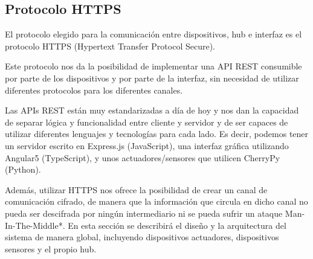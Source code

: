 \subsection{Protocolo HTTPS}
El protocolo elegido para la comunicación entre dispositivos, hub e interfaz es el protocolo HTTPS (Hypertext Transfer Protocol Secure).
\par
Este protocolo nos da la posibilidad de implementar una API REST consumible por parte de los dispositivos y por parte de la interfaz,
sin necesidad de utilizar diferentes protocolos para los diferentes canales.
\par
Las APIs REST están muy estandarizadas a día de hoy y nos dan la capacidad de separar lógica y funcionalidad entre cliente y servidor y de ser capaces
de utilizar diferentes lenguajes y tecnologías para cada lado. Es decir, podemos tener un servidor escrito en Express.js (JavaScript), una interfaz 
gráfica utilizando Angular5 (TypeScript), y unos actuadores/sensores que utilicen CherryPy (Python).
\par
Además, utilizar HTTPS nos ofrece la posibilidad de crear un canal de comunicación cifrado, de manera que la información que circula en dicho 
canal no pueda ser descifrada por ningún intermediario ni se pueda sufrir un ataque Man-In-The-Middle*.
En esta sección se describirá el diseño y la arquitectura del sistema de manera global, incluyendo dispositivos actuadores, 
dispositivos sensores y el propio hub.
